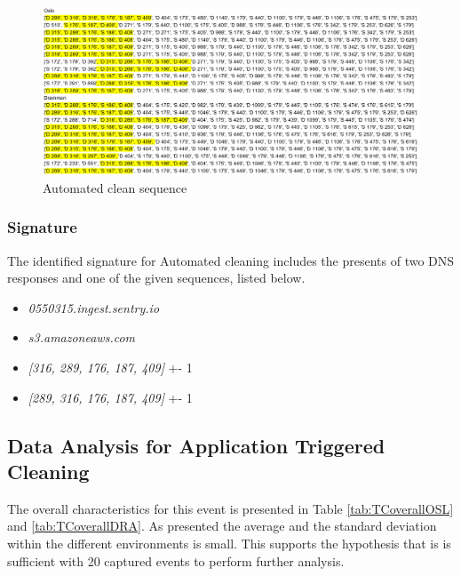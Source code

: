 \begin{figure}[H]
    \centering
    \includegraphics[width=\textwidth]{figures/Sequence_AC.png}
    \caption{Automated clean sequence}
    \label{fig:ACseq}
\end{figure}


\subsubsection{Signature}
The identified signature for Automated cleaning includes the presents of two DNS responses and one of the given sequences, listed below.  

\begin{itemize}
    \item \textit{0550315.ingest.sentry.io}
    \item \textit{s3.amazoneaws.com}
    \item \textit{[316, 289, 176, 187, 409]} +- 1
    \item \textit{[289, 316, 176, 187, 409]} +- 1
\end{itemize}


\subsection{Data Analysis for Application Triggered Cleaning}
The overall characteristics for this event is presented in Table \ref{tab:TCoverallOSL} and \ref{tab:TCoverallDRA}. As presented the average and the standard deviation within the different environments is small. This supports the hypothesis that is is sufficient with 20 captured events to perform further analysis.

